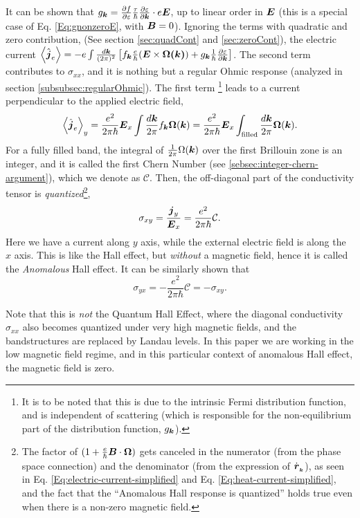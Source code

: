 \documentclass{report}
\renewcommand\vec[1]{\ensuremath\boldsymbol{#1}} %
\begin{document}
It can be shown that  $g_{\vec{k}} = \frac{\partial f} {\partial \varepsilon}
\frac{\tau}{\hbar} \frac{\partial \varepsilon}{\partial \vec{k}}\cdot e \vec{E}$, up to linear order in $\vec{E}$ (this is a special case of Eq. \eqref{Eq:gnonzeroE}, with $\vec{B} = 0$). Ignoring the terms with quadratic and zero contribution, (See section \ref{sec:quadCont} and \ref{sec:zeroCont}), the electric current $\expval{\hat{\vec{j}}_e} = -e \int \frac{d\vec{k}}{(2\pi)^2} \left[{f}_{\vec{k}} \frac{e}{\hbar} (\vec{E}\times\vec{\Omega(\vec{k})}) + {g}_{\vec{k}} \frac{1}{\hbar} \frac{\partial \varepsilon}{\partial \vec{k}}\right] $. The second term contributes to $\sigma_{xx}$, and it is nothing but a regular Ohmic response (analyzed in section \ref{subsubsec:regularOhmic}). The first term \footnote{It is to be noted that this is due to the intrinsic Fermi distribution function, and is independent of scattering (which is responsible for the non-equilibrium part of the distribution function, ${g}_{\vec{k}}$).} leads to a current perpendicular to the applied electric field,
$$\expval{\hat{\vec{j}}_e}_y = \frac{e^2}{2 \pi \hbar} \vec{E}_x \int \frac{d\vec{k}}{2\pi} {f}_{\vec{k}} \vec{\Omega}(\vec{k}) = \frac{e^2}{2 \pi \hbar} \vec{E}_x \int_{\text{filled}} \frac{d\vec{k}}{2\pi} \vec{\Omega}(\vec{k}).$$
For a fully filled band, the integral of $\frac{1}{2\pi}\Omega(\vec{k})$ over the first Brillouin zone is an integer, and it is called the first Chern Number (see \ref{sebsec:integer-chern-argument}), which we denote as $\mathcal{C}$. Then, the off-diagonal part of the conductivity tensor is \textit{quantized}\footnote{The factor of $(1 + \frac{e}{\hbar} \vec{B}\cdot\vec{\Omega})$ gets canceled in the numerator (from the phase space connection) and the denominator (from the expression of $\dot{\vec{r}}_{_{\vec{k}}}$), as seen in Eq. \eqref{Eq:electric-current-simplified} and Eq. \eqref{Eq:heat-current-simplified}, and the fact that the ``Anomalous Hall response is quantized'' holds true even when there is a non-zero magnetic field.},
$$\sigma_{xy} = \frac{\vec{j}_y}{\vec{E}_x} = \frac{e^2}{2\pi \hbar} \mathcal{C}.$$
Here we have a current along $y$ axis, while the external electric field is along the $x$ axis. This is like the Hall effect, but \textit{without} a magnetic field, hence it is called the \textit{Anomalous} Hall effect.
It can be similarly shown that
$$\sigma_{yx} = - \frac{e^2}{2\pi \hbar} \mathcal{C} = -\sigma_{xy}.$$

Note that this is \textit{not} the Quantum Hall Effect, where the diagonal conductivity $\sigma_{xx}$ also becomes quantized under very high magnetic fields, and the bandstructures are replaced by Landau levels. In this paper we are working in the low magnetic field regime, and in this particular context of anomalous Hall effect, the magnetic field is zero.
 
\end{document}
